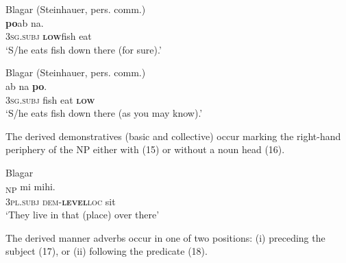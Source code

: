 \ea%
\label{ex:13}
   Blagar (Steinhauer, pers. comm.)   \\
 \textbf{{po}}{ab}    {na.} \\
    \textsc{3sg.subj} \textbf{\textsc{low}}fish  eat\\
\glt  `S/he eats fish down there (for sure).'
\z




\ea%
\label{ex:14}
    Blagar (Steinhauer, pers. comm.)  \\
  ab    na \textbf{{po}}{.}\\
  \textsc{3sg.subj} fish  eat  \textbf{\textsc{low}}   \\
\glt   `S/he eats fish down there (as you may know).'
\z









The derived demonstratives (basic and collective) occur marking the right-hand periphery of the NP either with (15) or without a noun head (16).



\ea%
\label{ex:15}
   Blagar \citep{Steinhauer2012}   \\
\textsubscript{NP} mi   {mihi.}\\
   \textsc{3pl.subj} \textsc {dem-}\textbf{\textsc{level}}\textsc{loc} sit \\
\glt `They live in that (place) over there'
\z







The derived manner adverbs occur in one of two positions: (i) preceding the subject (17), or (ii) following the predicate (18).



